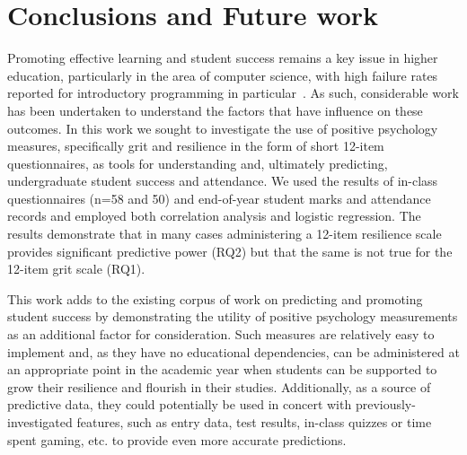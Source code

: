\documentclass[sigconf]{acmart}
\begin{document}
\section{Conclusions and Future work}


Promoting effective learning and student success remains a key issue in higher education, particularly in the area of computer science, with high failure rates reported for introductory programming in particular~\cite{Watson:2014:FRI:2591708.2591749,Bennedsen2019}. As such, considerable work has been undertaken to understand the factors that have influence on these outcomes. In this work we sought to investigate the use of positive psychology measures, specifically grit and resilience in the form of short 12-item questionnaires, as tools for understanding and, ultimately predicting, undergraduate student success and attendance. We used the results of in-class questionnaires (n=58 and 50) and end-of-year student marks and attendance records and employed both correlation analysis and logistic regression. The results demonstrate that in many cases administering a 12-item resilience scale provides significant predictive power (RQ2) but that the same is not true for the 12-item grit scale (RQ1).

This work adds to the existing corpus of work on predicting and promoting student success by demonstrating the utility of positive psychology measurements as an additional factor for consideration. Such measures are relatively easy to implement and, as they have no educational dependencies, can be administered at an appropriate point in the academic year when students can be supported to grow their resilience and flourish in their studies. Additionally, as a source of predictive data, they could potentially be used in concert with previously-investigated features, such as entry data, test results,  in-class quizzes or time spent gaming, etc. to provide even more accurate predictions. 
\end{document}

